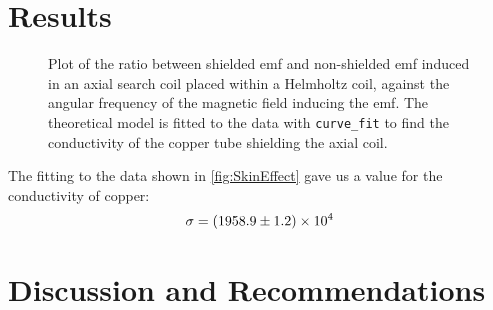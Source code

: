 \documentclass[12pt]{article}
\numberwithin{equation}{section}
\numberwithin{figure}{section}
\begin{document}
    \section{Results}\label{sec:Results}
    \begin{figure}[H]
        \begin{center}
           \caption{Plot of the ratio between shielded emf and non-shielded emf induced in an axial 
           search coil placed within a Helmholtz coil, against the angular frequency of the magnetic 
           field inducing the emf. The theoretical model is fitted to the data with 
           \texttt{curve\_fit} to find the conductivity of the copper tube shielding the axial coil.}
           \label{fig:SkinEffect}
        \end{center}
    \end{figure}
    The fitting to the data shown in \autoref{fig:SkinEffect} gave us a value for the 
    conductivity of copper:
    \begin{equation*}
        \sigma=\num{1958.9\pm1.2e4}
    \end{equation*}
    
    \section{Discussion and Recommendations}\label{sec:DiscussionRecommendations}
    
    
\end{document}
